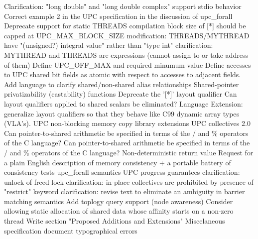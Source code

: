 {      \or %
        Clarification: "long double" and "long double complex" support
      \or %
        stdio behavior
      \or %
        Correct example 2 in the UPC specification in the discussion of upc\_forall
      \or %
        Deprecate support for static THREADS compilation
      \or %
        block size of [*] should be capped at UPC\_MAX\_BLOCK\_SIZE
      \or %
        modification: THREADS/MYTHREAD have "(unsigned?) integral value" rather than "type int"
      \or %
        clarification: MYTHREAD and THREADS are expressions (cannot assign to or take address of them)
      \or %
        Define UPC\_OFF\_MAX and required minumum value
      \or %
        Define accesses to UPC shared bit fields as atomic with respect to accesses to adjacent fields.
      \or %
        Add language to clarify shared/non-shared alias relationships
      \or %
        Shared-pointer privatizability (castability) functions
      \or %
        Deprecate the '[*]' layout qualifier
      \or %
        Can layout qualifiers applied to shared scalars be eliminated?
      \or %
        Language Extension:  generalize layout qualifiers so that they behave like C99 dynamic array types (VLA's).
      \or %
        UPC non-blocking memory copy library extensions
      \or %
        UPC collectives 2.0
      \or %
        Can pointer-to-shared arithmetic be specified in terms of the / and \% operators of the C language?
      \or %
        Can pointer-to-shared arithmetic be specified in terms of the / and \% operators of the C language?
      \or %
        Non-deterministic return value
      \or %
        Request for a plain English description of memory consistency + a portable battery of consistency tests
      \or %
        upc\_forall semantics
      \or %
        UPC progress guarantees
      \or %
        clarification: unlock of freed lock
      \or %
        clarification: in-place collectives are prohibited by presence of "restrict" keyword
      \or %
        clarification: revise text to eliminate an ambiguity in barrier matching semantics
      \or %
        Add toplogy query support (node awareness)
      \or %
        Consider allowing static allocation of shared data whose affinity starts on a non-zero thread
      \or %
        Write section "Proposed Additions and Extensions"
      \or %
        Miscelaneous specification document typographical errors
    \else
        \empty
    \fi
}
